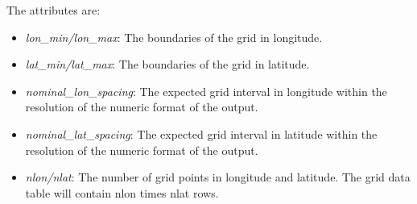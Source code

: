 \documentclass[letterpaper,10pt,english]{sphinxmanual}
\begin{document}
The attributes are:
\begin{itemize}
\item {} 
\emph{lon\_min/lon\_max}: The boundaries of the grid in longitude.

\item {} 
\emph{lat\_min/lat\_max}: The boundaries of the grid in latitude.

\item {} 
\emph{nominal\_lon\_spacing}: The expected grid interval in longitude within the resolution of the
numeric format of the output.

\item {} 
\emph{nominal\_lat\_spacing}: The expected grid interval in latitude within the resolution of the
numeric format of the output.

\item {} 
\emph{nlon/nlat}: The number of grid points in longitude and latitude. The grid data table will
contain nlon times nlat rows.

\end{itemize}
\end{document}
